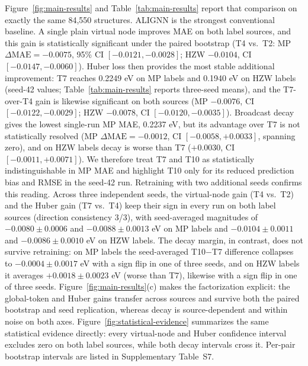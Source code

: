 \documentclass[a4paper,11pt]{article}
\begin{document}
Figure~\ref{fig:main-results} and Table~\ref{tab:main-results} report that comparison on exactly the same 84,550 structures. ALIGNN is the strongest conventional baseline. A single plain virtual node improves MAE on both label sources, and this gain is statistically significant under the paired bootstrap (T4 vs.\ T2: MP \(\Delta\mathrm{MAE}=-0.0075\), 95\% CI \([-0.0121,-0.0028]\); HZW \(-0.0104\), CI \([-0.0147,-0.0060]\)). Huber loss then provides the most stable additional improvement: T7 reaches 0.2249 eV on MP labels and 0.1940 eV on HZW labels (seed-42 values; Table~\ref{tab:main-results} reports three-seed means), and the T7-over-T4 gain is likewise significant on both sources (MP \(-0.0076\), CI \([-0.0122,-0.0029]\); HZW \(-0.0078\), CI \([-0.0120,-0.0035]\)). Broadcast decay gives the lowest single-run MP MAE, 0.2237 eV, but its advantage over T7 is not statistically resolved (MP \(\Delta\mathrm{MAE}=-0.0012\), CI \([-0.0058,+0.0033]\), spanning zero), and on HZW labels decay is worse than T7 (\(+0.0030\), CI \([-0.0011,+0.0071]\)). We therefore treat T7 and T10 as statistically indistinguishable in MP MAE and highlight T10 only for its reduced prediction bias and RMSE in the seed-42 run. Retraining with two additional seeds confirms this reading. Across three independent seeds, the virtual-node gain (T4 vs.\ T2) and the Huber gain (T7 vs.\ T4) keep their sign in every run on both label sources (direction consistency 3/3), with seed-averaged magnitudes of \(-0.0080\pm0.0006\) and \(-0.0088\pm0.0013\) eV on MP labels and \(-0.0104\pm0.0011\) and \(-0.0086\pm0.0010\) eV on HZW labels. The decay margin, in contrast, does not survive retraining: on MP labels the seed-averaged T10\(-\)T7 difference collapses to \(-0.0004\pm0.0017\) eV with a sign flip in one of three seeds, and on HZW labels it averages \(+0.0018\pm0.0023\) eV (worse than T7), likewise with a sign flip in one of three seeds. Figure~\ref{fig:main-results}(c) makes the factorization explicit: the global-token and Huber gains transfer across sources and survive both the paired bootstrap and seed replication, whereas decay is source-dependent and within noise on both axes. Figure~\ref{fig:statistical-evidence} summarizes the same statistical evidence directly: every virtual-node and Huber confidence interval excludes zero on both label sources, while both decay intervals cross it. Per-pair bootstrap intervals are listed in Supplementary Table~S7.
\end{document}
